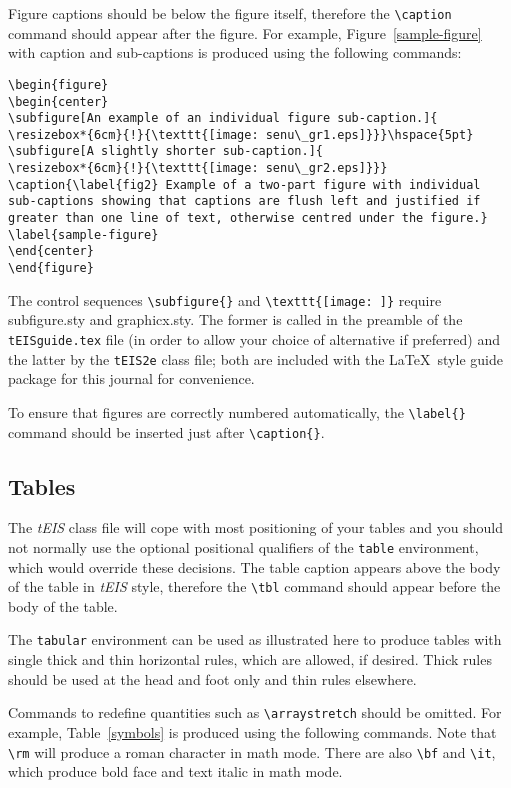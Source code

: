 \documentclass[]{tEIS2e}
\theoremstyle{plain}
\theoremstyle{remark}
\begin{document}
Figure captions should be below the figure itself, therefore the \verb"\caption" command should appear after the
figure. For example, Figure~\ref{sample-figure} with caption and sub-captions is produced using the following
commands:
%
\begin{verbatim}
\begin{figure}
\begin{center}
\subfigure[An example of an individual figure sub-caption.]{
\resizebox*{6cm}{!}{\texttt{[image: senu\_gr1.eps]}}}\hspace{5pt}
\subfigure[A slightly shorter sub-caption.]{
\resizebox*{6cm}{!}{\texttt{[image: senu\_gr2.eps]}}}
\caption{\label{fig2} Example of a two-part figure with individual
sub-captions showing that captions are flush left and justified if
greater than one line of text, otherwise centred under the figure.}
\label{sample-figure}
\end{center}
\end{figure}
\end{verbatim}

The control sequences \verb"\subfigure{}" and \verb"\texttt{[image: ]}" require subfigure.sty and graphicx.sty.
The former is called in the preamble of the \texttt{tEISguide.tex} file (in order to allow your choice of alternative if preferred)
and the latter by the \texttt{tEIS2e} class file; both are included with the \LaTeX\ style guide package for this journal for convenience.

To ensure that figures are correctly numbered automatically, the \verb"\label{}" command should be inserted just
after \verb"\caption{}".


\subsection{Tables}

The {\it tEIS} class file will cope with most positioning of your tables and you should not normally use the optional
positional qualifiers of the {\tt table} environment, which would override these decisions. The table caption
appears above the body of the table in {\it tEIS} style, therefore the \verb"\tbl" command should appear before
the body of the table.

The {\tt tabular} environment can be used as illustrated here to produce tables with single thick and thin horizontal rules, which
are allowed, if desired. Thick rules should be used at the head and foot only and thin rules elsewhere.

Commands to redefine quantities such as \verb"\arraystretch" should be omitted. For example, Table~\ref{symbols}
is produced using the following commands. Note that \verb"\rm" will produce a roman character in math mode. There
are also \verb"\bf" and \verb"\it", which produce bold face and text italic in math mode.
\end{document}
